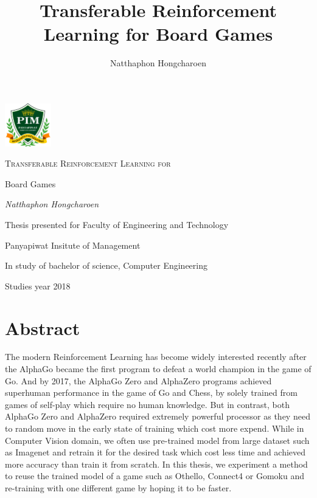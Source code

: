 \documentclass[12pt,a4paper]{article}
\title{Transferable Reinforcement Learning for Board Games}
\author{Natthaphon Hongcharoen}
\begin{document}

\begin{titlepage}
	\centering
	\includegraphics[width=0.15\textwidth]{logo.png}\par\vspace{1cm}
	{\scshape\Huge Transferable Reinforcement Learning for \par Board Games\par}
	\vfill
	{\Large\itshape Natthaphon Hongcharoen\par}
	\vfill
	{\Large  \par}
	{\large Thesis presented for Faculty of Engineering and Technology \par\vspace{0.1cm}}
	{\large Panyapiwat Insitute of Management\par\vspace{0.1cm}}
	{\large In study of bachelor of science, Computer Engineering
	}


	{\large Studies year 2018 \par}
\end{titlepage}

\clearpage %
\pagestyle{empty}  %

\section*{Abstract}
\tab\hspace{0.3cm}The modern Reinforcement Learning has become widely interested recently after the AlphaGo\cite{AlphaGo} became the first program to defeat a world champion in the game of Go. And by 2017, the AlphaGo Zero\cite{AlphaGoZero} and AlphaZero\cite{AlphaZero} programs achieved superhuman performance in the game of Go and Chess, by solely trained from games of self-play which require no human knowledge. But in contrast, both AlphaGo Zero and AlphaZero required extremely powerful processor as they need to random move in the early state of training which cost more expend. While in Computer Vision domain, we often use pre-trained model from large dataset such as Imagenet\cite{Imagenet} and retrain it for the desired task which cost less time and achieved more accuracy than train it from scratch. In this thesis, we experiment a method to reuse the trained model of a game such as Othello, Connect4 or Gomoku and re-training with one different game by hoping it to be faster.
\clearpage
\end{document}
